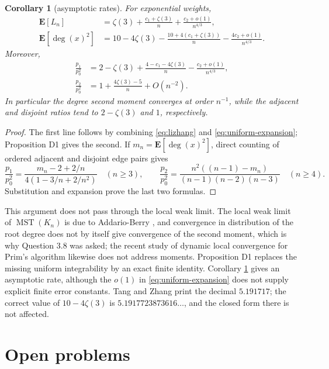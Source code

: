 \documentclass[11pt,a4paper]{amsart}
\theoremstyle{plain}
\newtheorem{corollary}[theorem]{Corollary}
\theoremstyle{definition}
\theoremstyle{remark}
\newcommand{\MST}{\operatorname{MST}}
\newcommand{\E}{\mathbf{E}}
\DeclareMathOperator{\dg}{deg}
\begin{document}
\begin{corollary}[asymptotic rates]
\label{cor:rates}
For exponential weights,
\begin{align*}
\E[L_n]
&=\zeta(3)+\frac{c_1+\zeta(3)}n+\frac{c_2+o(1)}{n^{4/3}},\\
\E[\dg(x)^2]
&=10-4\zeta(3)-\frac{10+4(c_1+\zeta(3))}{n}
-\frac{4c_2+o(1)}{n^{4/3}}.
\end{align*}
Moreover,
\begin{align*}
\frac{p_1}{p_0^2}
&=2-\zeta(3)+\frac{4-c_1-4\zeta(3)}n
-\frac{c_2+o(1)}{n^{4/3}},\\
\frac{p_2}{p_0^2}
&=1+\frac{4\zeta(3)-5}{n}+O(n^{-2}).
\end{align*}
In particular the degree second moment converges at order $n^{-1}$, while the
adjacent and disjoint ratios tend to $2-\zeta(3)$ and $1$, respectively.
\end{corollary}

\begin{proof}
The first line follows by combining \eqref{eq:lizhang} and
\eqref{eq:uniform-expansion}; Proposition D1 gives the second. If
$m_n=\E[\dg(x)^2]$, direct counting of ordered adjacent and disjoint edge pairs
gives
\[
\frac{p_1}{p_0^2}
=\frac{m_n-2+2/n}{4(1-3/n+2/n^2)}\quad(n\ge3),\qquad
\frac{p_2}{p_0^2}
=\frac{n^2((n-1)-m_n)}{(n-1)(n-2)(n-3)}\quad(n\ge4).
\]
Substitution and expansion prove the last two formulas.
\end{proof}

This argument does not pass through the local weak limit. The local weak limit
of $\MST(K_n)$ is due to Addario-Berry
\cite{ABerry}, and convergence in distribution of the root degree does not by
itself give convergence of the second moment, which is why Question 3.8 was
asked; the recent study of dynamic local convergence for Prim's algorithm
\cite{CGH} likewise does not address moments. Proposition D1 replaces the
missing uniform integrability by an exact finite identity. Corollary
\ref{cor:rates} gives an asymptotic rate, although the $o(1)$ in
\eqref{eq:uniform-expansion} does not supply explicit finite error constants.
Tang and Zhang \cite[Proposition 3.11]{TZ}
print the decimal $5.191717$; the correct value of $10-4\zeta(3)$ is
$5.1917723873616\dots$, and the closed form there is not affected.

\section{Open problems}
\label{sec:open}
\end{document}
